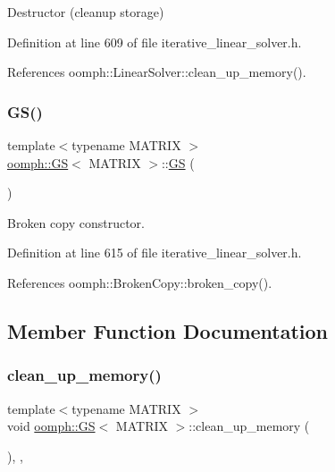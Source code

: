Destructor (cleanup storage) 



Definition at line 609 of file iterative\+\_\+linear\+\_\+solver.\+h.



References oomph\+::\+Linear\+Solver\+::clean\+\_\+up\+\_\+memory().

\mbox{\label{classoomph_1_1GS_a0ca94fa6f508ed9560d7cf69082937f2}} 
\subsubsection{\texorpdfstring{G\+S()}{GS()}\hspace{0.1cm}{\footnotesize\ttfamily [2/2]}}
{\footnotesize\ttfamily template$<$typename M\+A\+T\+R\+IX $>$ \\
\hyperlink{classoomph_1_1GS}{oomph\+::\+GS}$<$ M\+A\+T\+R\+IX $>$\+::\hyperlink{classoomph_1_1GS}{GS} (\begin{DoxyParamCaption}\item[{const \hyperlink{classoomph_1_1GS}{GS}$<$ M\+A\+T\+R\+IX $>$ \&}]{ }\end{DoxyParamCaption})\hspace{0.3cm}{\ttfamily [inline]}}



Broken copy constructor. 



Definition at line 615 of file iterative\+\_\+linear\+\_\+solver.\+h.



References oomph\+::\+Broken\+Copy\+::broken\+\_\+copy().



\subsection{Member Function Documentation}
\mbox{\label{classoomph_1_1GS_a7dcf28fef43088ead0e662a32275b383}} 
\subsubsection{\texorpdfstring{clean\+\_\+up\+\_\+memory()}{clean\_up\_memory()}}
{\footnotesize\ttfamily template$<$typename M\+A\+T\+R\+IX $>$ \\
void \hyperlink{classoomph_1_1GS}{oomph\+::\+GS}$<$ M\+A\+T\+R\+IX $>$\+::clean\+\_\+up\+\_\+memory (\begin{DoxyParamCaption}{ }\end{DoxyParamCaption})\hspace{0.3cm}{\ttfamily [inline]}, {\ttfamily [private]}, {\ttfamily [virtual]}}



